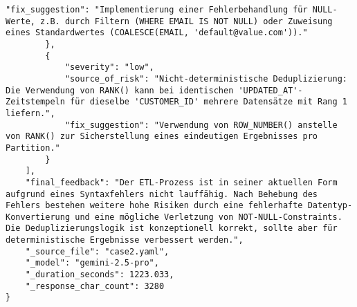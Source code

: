 \begin{lstlisting}[caption={Ausgabe: GEMINI 2.5 Pro Anwendungsfall 2 Hauptdurchlauf},label={gemini_case2_prompt1}]
            "fix_suggestion": "Implementierung einer Fehlerbehandlung für NULL-Werte, z.B. durch Filtern (WHERE EMAIL IS NOT NULL) oder Zuweisung eines Standardwertes (COALESCE(EMAIL, 'default@value.com'))."
        },
        {
            "severity": "low",
            "source_of_risk": "Nicht-deterministische Deduplizierung: Die Verwendung von RANK() kann bei identischen 'UPDATED_AT'-Zeitstempeln für dieselbe 'CUSTOMER_ID' mehrere Datensätze mit Rang 1 liefern.",
            "fix_suggestion": "Verwendung von ROW_NUMBER() anstelle von RANK() zur Sicherstellung eines eindeutigen Ergebnisses pro Partition."
        }
    ],
    "final_feedback": "Der ETL-Prozess ist in seiner aktuellen Form aufgrund eines Syntaxfehlers nicht lauffähig. Nach Behebung des Fehlers bestehen weitere hohe Risiken durch eine fehlerhafte Datentyp-Konvertierung und eine mögliche Verletzung von NOT-NULL-Constraints. Die Deduplizierungslogik ist konzeptionell korrekt, sollte aber für deterministische Ergebnisse verbessert werden.",
    "_source_file": "case2.yaml",
    "_model": "gemini-2.5-pro",
    "_duration_seconds": 1223.033,
    "_response_char_count": 3280
}
\end{lstlisting}

